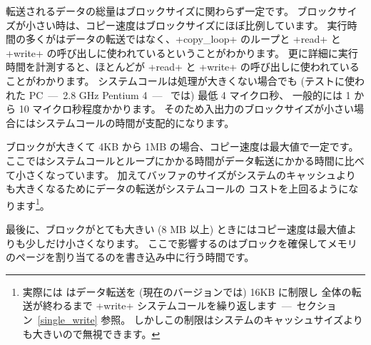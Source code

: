 転送されるデータの総量はブロックサイズに関わらず一定です。
ブロックサイズが小さい時は、コピー速度はブロックサイズにほぼ比例しています。
実行時間の多くがはデータの転送ではなく、\ml+copy_loop+ のループと
\ml+read+ と \ml+write+ の呼び出しに使われているということがわかります。
更に詳細に実行時間を計測すると、ほとんどが \ml+read+ と \ml+write+ の呼び出しに使われていることがわかります。
システムコールは処理が大きくない場合でも (テストに使われた PC~---~2.8 GHz Pentium 4~---~ では) 最低 4 マイクロ秒、
一般的には 1 から 10 マイクロ秒程度かかります。
そのため入出力のブロックサイズが小さい場合にはシステムコールの時間が支配的になります。

ブロックが大きくて 4KB から 1MB の場合、コピー速度は最大値で一定です。
ここではシステムコールとループにかかる時間がデータ転送にかかる時間に比べて小さくなっています。
加えてバッファのサイズがシステムのキャッシュよりも大きくなるためにデータの転送がシステムコールの
コストを上回るようになります\footnote{実際には \ocaml はデータ転送を (現在のバージョンでは) 16KB に制限し
  全体の転送が終わるまで \ml+write+ システムコールを繰り返します~---~セクション~\ref{single_write} 参照。
  しかしこの制限はシステムのキャッシュサイズよりも大きいので無視できます。}。

最後に、ブロックがとても大きい (8 MB 以上) ときにはコピー速度は最大値よりも少しだけ小さくなります。
ここで影響するのはブロックを確保してメモリのページを割り当てるのを書き込み中に行う時間です。

